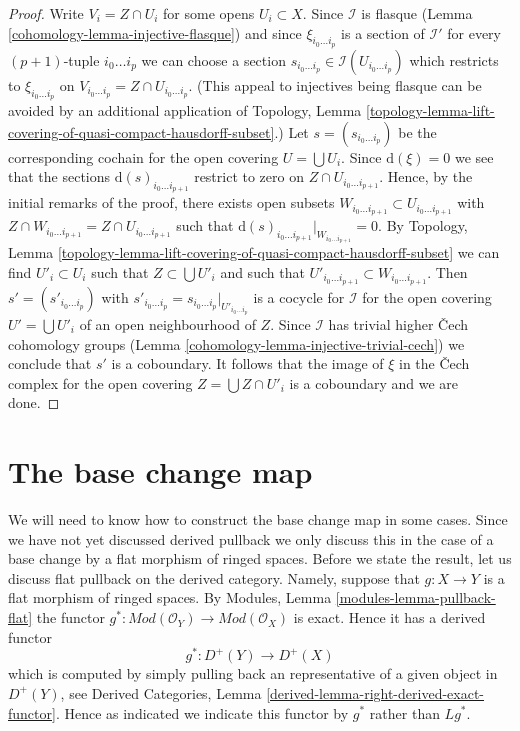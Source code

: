 \begin{proof}
\medskip\noindent
Write $V_i = Z \cap U_i$ for some opens $U_i \subset X$.
Since $\mathcal{I}$ is flasque (Lemma \ref{cohomology-lemma-injective-flasque})
and since $\xi_{i_0 \ldots i_p}$ is a section of $\mathcal{I}'$
for every $(p + 1)$-tuple $i_0 \ldots i_p$ we can choose
a section $s_{i_0 \ldots i_p} \in \mathcal{I}(U_{i_0 \ldots i_p})$
which restricts to $\xi_{i_0 \ldots i_p}$ on
$V_{i_0 \ldots i_p} = Z \cap U_{i_0 \ldots i_p}$.
(This appeal to injectives being flasque can be avoided by an
additional application of
Topology, Lemma
\ref{topology-lemma-lift-covering-of-quasi-compact-hausdorff-subset}.)
Let $s = (s_{i_0 \ldots i_p})$ be the corresponding cochain
for the open covering $U = \bigcup U_i$.
Since $\text{d}(\xi) = 0$ we see that the sections
$\text{d}(s)_{i_0 \ldots i_{p + 1}}$ restrict to zero
on $Z \cap U_{i_0 \ldots i_{p + 1}}$. Hence, by the initial
remarks of the proof, there exists open subsets
$W_{i_0 \ldots i_{p + 1}} \subset U_{i_0 \ldots i_{p + 1}}$
with $Z \cap W_{i_0 \ldots i_{p + 1}} = Z \cap U_{i_0 \ldots i_{p + 1}}$
such that $\text{d}(s)_{i_0 \ldots i_{p + 1}}|_{W_{i_0 \ldots i_{p + 1}}} = 0$.
By Topology, Lemma
\ref{topology-lemma-lift-covering-of-quasi-compact-hausdorff-subset}
we can find $U'_i \subset U_i$ such that $Z \subset \bigcup U'_i$
and such that $U'_{i_0 \ldots i_{p + 1}} \subset W_{i_0 \ldots i_{p + 1}}$.
Then $s' = (s'_{i_0 \ldots i_p})$ with
$s'_{i_0 \ldots i_p} = s_{i_0 \ldots i_p}|_{U'_{i_0 \ldots i_p}}$
is a cocycle for $\mathcal{I}$ for the open covering
$U' = \bigcup U'_i$ of an open neighbourhood of $Z$.
Since $\mathcal{I}$ has trivial higher {\v C}ech cohomology groups
(Lemma \ref{cohomology-lemma-injective-trivial-cech})
we conclude that $s'$ is a coboundary. It follows that the image of
$\xi$ in the {\v C}ech complex for the open covering
$Z = \bigcup Z \cap U'_i$ is a coboundary and we are done.
\end{proof}

\section{The base change map}
\label{cohomology-section-base-change-map}
We will need to know how to construct the base change map in some cases.
Since we have not yet discussed derived pullback we only discuss
this in the case of a base change by a flat morphism of ringed spaces.
Before we state the result, let us discuss flat pullback on the derived
category. Namely, suppose that $g : X \to Y$ is a flat morphism of
ringed spaces. By Modules, Lemma \ref{modules-lemma-pullback-flat}
the functor $g^* : \textit{Mod}(\mathcal{O}_Y) \to
\textit{Mod}(\mathcal{O}_X)$ is exact. Hence it has a derived functor
$$
g^* : D^{+}(Y) \to D^{+}(X)
$$
which is computed by simply pulling back an representative of a given
object in $D^{+}(Y)$, see
Derived Categories, Lemma \ref{derived-lemma-right-derived-exact-functor}.
Hence as indicated we indicate this functor by $g^*$ rather than
$Lg^*$.

